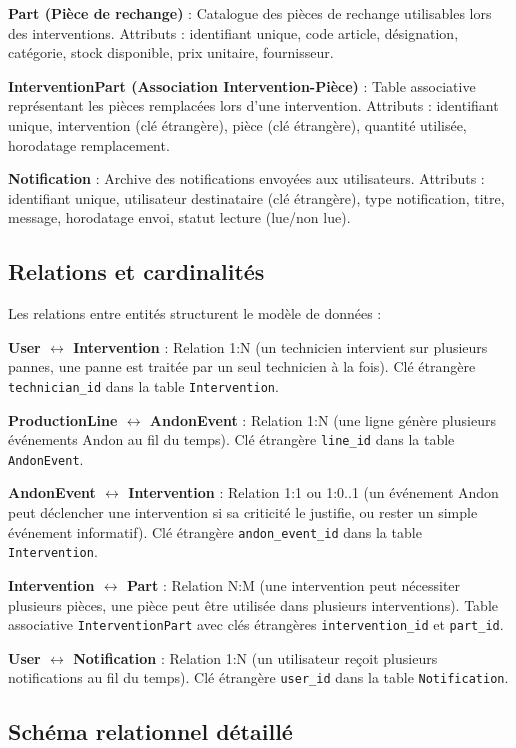 \textbf{Part (Pièce de rechange)} : Catalogue des pièces de rechange utilisables lors des interventions. Attributs : identifiant unique, code article, désignation, catégorie, stock disponible, prix unitaire, fournisseur.

\textbf{InterventionPart (Association Intervention-Pièce)} : Table associative représentant les pièces remplacées lors d'une intervention. Attributs : identifiant unique, intervention (clé étrangère), pièce (clé étrangère), quantité utilisée, horodatage remplacement.

\textbf{Notification} : Archive des notifications envoyées aux utilisateurs. Attributs : identifiant unique, utilisateur destinataire (clé étrangère), type notification, titre, message, horodatage envoi, statut lecture (lue/non lue).

\subsection{Relations et cardinalités}

Les relations entre entités structurent le modèle de données :

\textbf{User $\leftrightarrow$ Intervention} : Relation 1:N (un technicien intervient sur plusieurs pannes, une panne est traitée par un seul technicien à la fois). Clé étrangère \texttt{technician\_id} dans la table \texttt{Intervention}.

\textbf{ProductionLine $\leftrightarrow$ AndonEvent} : Relation 1:N (une ligne génère plusieurs événements Andon au fil du temps). Clé étrangère \texttt{line\_id} dans la table \texttt{AndonEvent}.

\textbf{AndonEvent $\leftrightarrow$ Intervention} : Relation 1:1 ou 1:0..1 (un événement Andon peut déclencher une intervention si sa criticité le justifie, ou rester un simple événement informatif). Clé étrangère \texttt{andon\_event\_id} dans la table \texttt{Intervention}.

\textbf{Intervention $\leftrightarrow$ Part} : Relation N:M (une intervention peut nécessiter plusieurs pièces, une pièce peut être utilisée dans plusieurs interventions). Table associative \texttt{InterventionPart} avec clés étrangères \texttt{intervention\_id} et \texttt{part\_id}.

\textbf{User $\leftrightarrow$ Notification} : Relation 1:N (un utilisateur reçoit plusieurs notifications au fil du temps). Clé étrangère \texttt{user\_id} dans la table \texttt{Notification}.


\subsection{Schéma relationnel détaillé}

